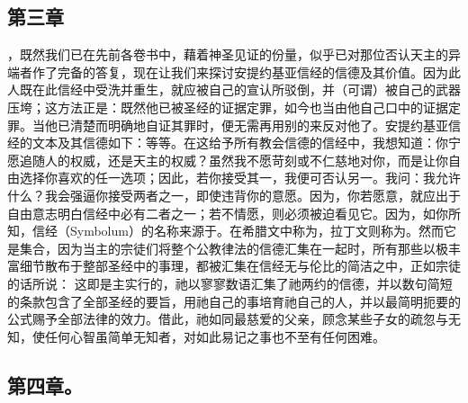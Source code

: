 
\subsection{第三章}

\par

，既然我们已在先前各卷书中，藉着神圣见证的份量，似乎已对那位否认天主的异端者作了完备的答复，现在让我们来探讨安提约基亚信经的信德及其价值。因为此人既在此信经中受洗并重生，就应被自己的宣认所驳倒，并（可谓）被自己的武器压垮；这方法正是：既然他已被圣经的证据定罪，如今也当由他自己口中的证据定罪。当他已清楚而明确地自证其罪时，便无需再用别的来反对他了。安提约基亚信经的文本及其信德如下：等等。在这给予所有教会信德的信经中，我想知道：你宁愿追随人的权威，还是天主的权威？虽然我不愿苛刻或不仁慈地对你，而是让你自由选择你喜欢的任一选项；因此，若你接受其一，我便可否认另一。我问：我允许什么？我会强逼你接受两者之一，即使违背你的意愿。因为，你若愿意，就应出于自由意志明白信经中必有二者之一；若不情愿，则必须被迫看见它。因为，如你所知，信经（Symbolum）的名称来源于。在希腊文中称为，拉丁文则称为。然而它是集合，因为当主的宗徒们将整个公教律法的信德汇集在一起时，所有那些以极丰富细节散布于整部圣经中的事理，都被汇集在信经无与伦比的简洁之中，正如宗徒的话所说： 这即是主实行的，祂以寥寥数语汇集了祂两约的信德，并以数句简短的条款包含了全部圣经的要旨，用祂自己的事培育祂自己的人，并以最简明扼要的公式赐予全部法律的效力。借此，祂如同最慈爱的父亲，顾念某些子女的疏忽与无知，使任何心智虽简单无知者，对如此易记之事也不至有任何困难。\par


\subsection{第四章。}

